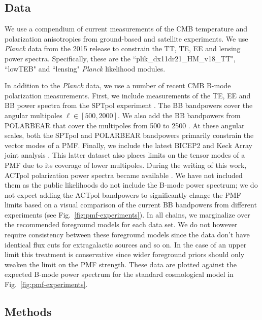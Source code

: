 \documentclass[apj]{emulateapj}
\newcommand{\planck}{{\sl Planck}}
\newcommand{\pb}{POLARBEAR}
\newcommand{\sptpol}{SPTpol}
\begin{document}
\subsection{Data}

We use a compendium of current measurements of the CMB temperature and polarization anisotropies from ground-based and satellite experiments. 
We use \planck{} data from the 2015 release to constrain the TT, TE, EE and lensing power spectra. 
Specifically, these are the ``plik\_dx11dr21\_HM\_v18\_TT", ``lowTEB" and ``lensing" \planck{} likelihood modules. 


In addition to the \planck{} data, we use a number of recent CMB B-mode polarization measurements. 
First, we include measurements of the TE, EE and BB power spectra from the \sptpol{} experiment \citep{crites15,keisler15}. 
The BB bandpowers cover the angular multipoles $\ell \in [500,2000]$. 
We also add the BB bandpowers from \pb{} that cover the multipoles from 500 to 2500 \citep{polarbear15}. 
At these angular scales, both the \sptpol{} and \pb{} bandpowers primarily constrain the vector modes of a PMF. 
Finally, we include the latest BICEP2 and Keck Array  joint analysis \citep{bicepkeck15}. 
This latter dataset also places limits on the tensor modes of a PMF due to its coverage of lower multipoles. 
During the writing of this work, ACTpol polarization power spectra became available \citep{naess14,louis16}. 
We have not included them as the public likelihoods do not include the B-mode power spectrum; we do not expect adding the ACTpol bandpowers to significantly change the PMF limits based on a visual comparison of the current BB bandpowers from different experiments (see Fig.~\ref{fig:pmf-experiments}).
In all chains, we marginalize over the recommended foreground models for each data set. 
We do not however require consistency between these foreground models since the data don't have identical flux cuts for extragalactic sources and so on. 
In the case of an upper limit this treatment is conservative since wider foreground priors should only weaken the limit on the PMF strength. 
These data are plotted against the expected B-mode power spectrum for the standard cosmological model in Fig.~\ref{fig:pmf-experiments}. 

\subsection{Methods}
\end{document}
